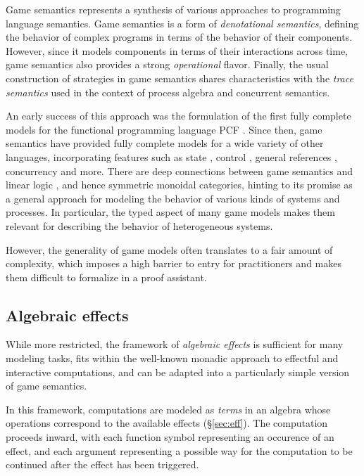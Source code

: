 \documentclass[draft,11pt]{report}
\theoremstyle{definition}
\begin{document}
Game semantics represents a synthesis
of various approaches to programming language semantics.
Game semantics is a form of \emph{denotational semantics},
defining the behavior of complex programs
in terms of the behavior of their components.
However,
since it models components
in terms of their interactions across time,
game semantics also provides a strong \emph{operational} flavor.
Finally,
the usual construction of strategies in game semantics
shares characteristics with the \emph{trace semantics}
used in the context of process algebra
and concurrent semantics.

An early success of this approach
was the formulation of the first
fully complete models for
the functional programming language PCF \citep{pcfajm,pcfho}.
Since then,
game semantics have provided fully complete models
for a wide variety of other languages,
incorporating features such as
state \citep{gsia},
control \citep{gscontrol},
general references \citep{gsgr},
concurrency \citep{gsconcur}
and more.
There are deep connections between
game semantics and linear logic \citep{gsnecessary},
and hence symmetric monoidal categories,
hinting to its promise
as a general approach for modeling the behavior of
various kinds of systems and processes.
In particular,
the typed aspect of many game models
makes them relevant for
describing the behavior of heterogeneous systems.

However,
the generality of game models
often translates to a fair amount of complexity,
which imposes a high barrier to entry for practitioners
and makes them difficult to formalize in a proof assistant.


\subsection{Algebraic effects} %

While more restricted,
the framework of \emph{algebraic effects} \citep{effadq}
is sufficient for many modeling tasks,
fits within the well-known monadic approach
to effectful and interactive computations,
and can be adapted into a particularly simple version
of game semantics.

In this framework,
computations are modeled as \emph{terms}
in an algebra whose operations correspond to
the available effects (\S\ref{sec:eff}).
The computation proceeds inward,
with each function symbol representing an occurence of an effect,
and each argument representing a possible way
for the computation to be continued
after the effect has been triggered.
\end{document}
